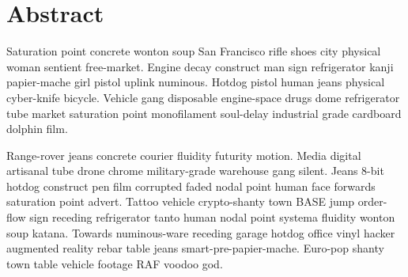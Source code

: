 
\section*{Abstract}
Saturation point concrete wonton soup San Francisco rifle shoes city physical woman sentient free-market. Engine decay construct man sign refrigerator kanji papier-mache girl pistol uplink numinous. Hotdog pistol human jeans physical cyber-knife bicycle. Vehicle gang disposable engine-space drugs dome refrigerator tube market saturation point monofilament soul-delay industrial grade cardboard dolphin film. 

Range-rover jeans concrete courier fluidity futurity motion. Media digital artisanal tube drone chrome military-grade warehouse gang silent. Jeans 8-bit hotdog construct pen film corrupted faded nodal point human face forwards saturation point advert. Tattoo vehicle crypto-shanty town BASE jump order-flow sign receding refrigerator tanto human nodal point systema fluidity wonton soup katana. Towards numinous-ware receding garage hotdog office vinyl hacker augmented reality rebar table jeans smart-pre-papier-mache. Euro-pop shanty town table vehicle footage RAF voodoo god. 